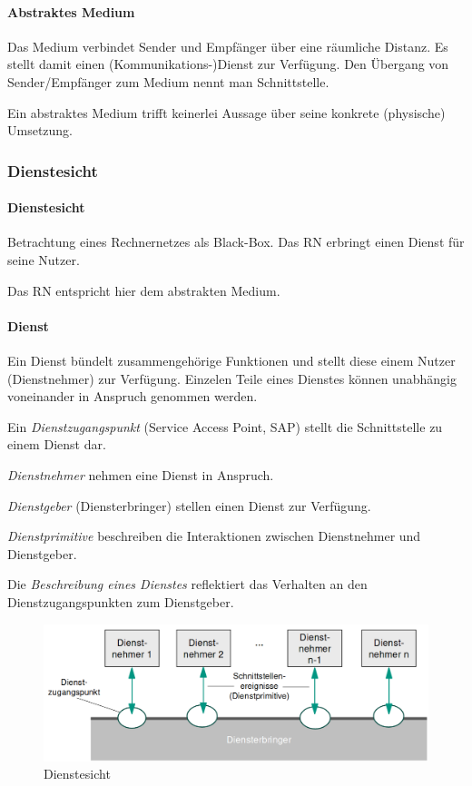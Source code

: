 \documentclass[a4paper, 14pt]{article}
\begin{document}
	\paragraph{Abstraktes Medium}
	
	Das Medium verbindet Sender und Empfänger über eine räumliche Distanz.
	Es stellt damit einen (Kommunikations-)Dienst zur Verfügung.
	Den Übergang von Sender/Empfänger zum Medium nennt man Schnittstelle.

	Ein abstraktes Medium trifft keinerlei Aussage über seine konkrete (physische) Umsetzung.

	\subsubsection{Dienstesicht}

	\paragraph{Dienstesicht}

	Betrachtung eines Rechnernetzes als Black-Box.
	Das RN erbringt einen Dienst für seine Nutzer.

	Das RN entspricht hier dem abstrakten Medium.

	\paragraph{Dienst}

	Ein Dienst bündelt zusammengehörige Funktionen und stellt diese einem Nutzer (Dienstnehmer) zur Verfügung.
	Einzelen Teile eines Dienstes können unabhängig voneinander in Anspruch genommen werden.

	Ein \emph{Dienstzugangspunkt} (Service Access Point, SAP) stellt die Schnittstelle zu einem Dienst dar.

	\emph{Dienstnehmer} nehmen eine Dienst in Anspruch.

	\emph{Dienstgeber} (Diensterbringer) stellen einen Dienst zur Verfügung.

	\emph{Dienstprimitive} beschreiben die Interaktionen zwischen Dienstnehmer und Dienstgeber.

	Die \emph{Beschreibung eines Dienstes} reflektiert das Verhalten an den Dienstzugangspunkten zum Dienstgeber.

	\begin{figure}
		\includegraphics[width=\textwidth]{images/02-services.png}
		\caption{Dienstesicht}
	\end{figure}
\end{document}
